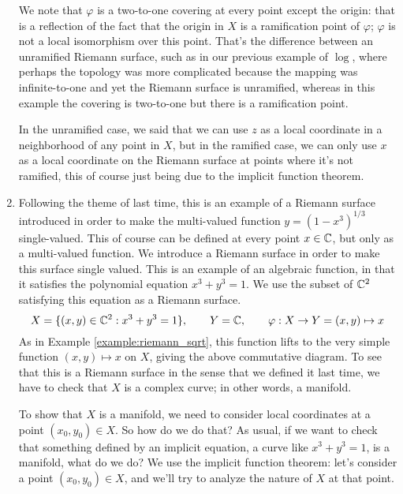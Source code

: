 \documentclass{article}
\begin{document}
\begin{enumerate}
  We note that \(\varphi\) is a two-to-one covering at every point except the origin: that is a reflection of the fact that the origin in \(X\) is a ramification point of \(\varphi\); \(\varphi\) is not a local isomorphism over this point. That's the difference between an unramified Riemann surface, such as in our previous example of \(\log\), where perhaps the topology was more complicated because the mapping was infinite-to-one and yet the Riemann surface is unramified, whereas in this example the covering is two-to-one but there is a ramification point.

  In the unramified case, we said that we can use \(z\) as a local coordinate in a neighborhood of any point in \(X\), but in the ramified case, we can only use \(x\) as a local coordinate on the Riemann surface at points where it's not ramified, this of course just being due to the implicit function theorem.

  \item Following the theme of last time, this is an example of a Riemann surface introduced in order to make the multi-valued function \(y = (1 - x^3)^{1/3}\) single-valued. This of course can be defined at every point \(x \in \mathbb{C}\), but only as a multi-valued function. We introduce a Riemann surface in order to make this surface single valued. This is an example of an algebraic function, in that it satisfies the polynomial equation \(x^3 + y^3 = 1\). We use the subset of \(\mathbb{C}^2\) satisfying this equation as a Riemann surface.
  \begin{equation}
    X = \{(x, y) \in \mathbb{C}^2 : x^3 + y^3 = 1\},
    \qquad Y = \mathbb{C},
    \qquad \varphi: X \to Y = (x, y) \mapsto x
  \end{equation}
  As in Example \ref{example:riemann_sqrt}, this function lifts to the very simple function \((x, y) \mapsto x\) on \(X\), giving the above commutative diagram. To see that this is a Riemann surface in the sense that we defined it last time, we have to check that \(X\) is a complex curve; in other words, a manifold.

  To show that \(X\) is a manifold, we need to consider local coordinates at a point \((x_0, y_0) \in X\). So how do we do that? As usual, if we want to check that something defined by an implicit equation, a curve like \(x^3 + y^3 = 1\), is a manifold, what do we do? We use the implicit function theorem: let's consider a point \((x_0, y_0) \in X\), and we'll try to analyze the nature of \(X\) at that point.

  \begin{itemize}


\end{itemize}
\end{enumerate}
\end{document}
